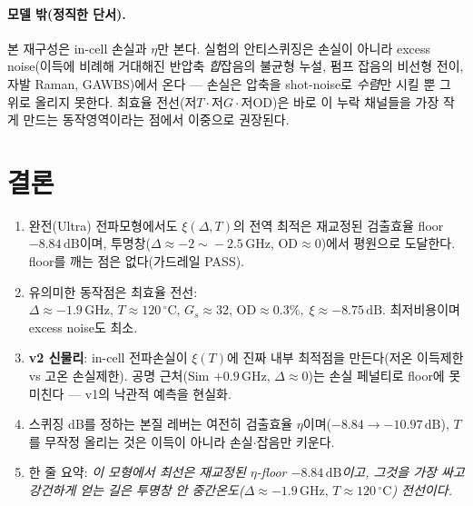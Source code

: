 \documentclass[11pt,a4paper]{article}
\newcommand{\dB}{\,\mathrm{dB}}
\newcommand{\GHz}{\,\mathrm{GHz}}
\newcommand{\degC}{\,^{\circ}\mathrm{C}}
\begin{document}
\paragraph{모델 밖(정직한 단서).} 본 재구성은 in-cell 손실과 $\eta$만 본다. 실험의 안티스퀴징은
손실이 아니라 excess noise(이득에 비례해 거대해진 반압축 \emph{합}잡음의 불균형 누설, 펌프
잡음의 비선형 전이, 자발 Raman, GAWBS)에서 온다 --- 손실은 압축을 shot-noise로 \emph{수렴}만
시킬 뿐 그 위로 올리지 못한다. 최효율 전선(저$T\cdot$저$G\cdot$저OD)은 바로 이 누락 채널들을
가장 작게 만드는 동작영역이라는 점에서 이중으로 권장된다.

\section{결론}
\begin{enumerate}[nosep]
\item 완전(Ultra) 전파모형에서도 $\xi(\Delta,T)$의 전역 최적은 재교정된 검출효율 floor
      $-8.84\dB$이며, 투명창($\Delta\approx-2\!\sim\!-2.5\GHz$, $\mathrm{OD}\approx0$)에서 평원으로
      도달한다. floor를 깨는 점은 없다(가드레일 PASS).
\item 유의미한 동작점은 최효율 전선: $\Delta\approx-1.9\GHz,\,T\approx120\degC,\,G_s\approx32,\,
      \mathrm{OD}\approx0.3\%,\;\xi\approx-8.75\dB$. 최저비용이며 excess noise도 최소.
\item \textbf{v2 신물리}: in-cell 전파손실이 $\xi(T)$에 진짜 내부 최적점을 만든다(저온 이득제한
      vs 고온 손실제한). 공명 근처(Sim $+0.9\GHz$, $\Delta\approx0$)는 손실 페널티로 floor에
      못 미친다 --- v1의 낙관적 예측을 현실화.
\item 스퀴징 dB를 정하는 본질 레버는 여전히 검출효율 $\eta$이며($-8.84\to-10.97\dB$),
      $T$를 무작정 올리는 것은 이득이 아니라 손실$\cdot$잡음만 키운다.
\item 한 줄 요약: \emph{이 모형에서 최선은 재교정된 $\eta$-floor $-8.84\dB$이고, 그것을 가장 싸고
      강건하게 얻는 길은 투명창 안 중간온도($\Delta\approx-1.9\GHz,\,T\approx120\degC$) 전선이다.}
\end{enumerate}

\appendix
\end{document}
